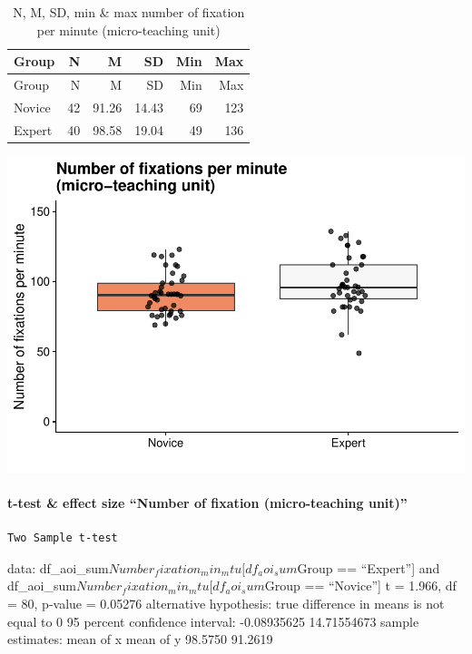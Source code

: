 \documentclass[
]{article}
\begin{document}
\begin{longtable}[]{@{}lrrrrr@{}}
\caption{N, M, SD, min \& max number of fixation per minute
(micro-teaching unit)}\tabularnewline
\toprule\noalign{}
Group & N & M & SD & Min & Max \\
\midrule\noalign{}
\endfirsthead
\toprule\noalign{}
Group & N & M & SD & Min & Max \\
\midrule\noalign{}
\endhead
\bottomrule\noalign{}
\endlastfoot
Novice & 42 & 91.26 & 14.43 & 69 & 123 \\
Expert & 40 & 98.58 & 19.04 & 49 & 136 \\
\end{longtable}

\includegraphics{expertise_2024_09_26_no_outlierdetection_MK_files/figure-latex/nof_all-1.pdf}

\paragraph{t-test \& effect size ``Number of fixation (micro-teaching
unit)''}\label{t-test-effect-size-number-of-fixation-micro-teaching-unit}

\begin{verbatim}
Two Sample t-test
\end{verbatim}

data: df\_aoi\_sum\(Number_fixation_min_mtu[df_aoi_sum\)Group ==
``Expert''{]} and
df\_aoi\_sum\(Number_fixation_min_mtu[df_aoi_sum\)Group == ``Novice''{]}
t = 1.966, df = 80, p-value = 0.05276 alternative hypothesis: true
difference in means is not equal to 0 95 percent confidence interval:
-0.08935625 14.71554673 sample estimates: mean of x mean of y 98.5750
91.2619
\end{document}
